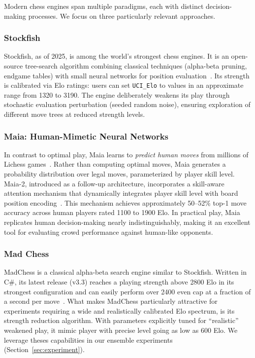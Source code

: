 \documentclass[format=acmsmall, review=false]{acmart}
\begin{document}
Modern chess engines span multiple paradigms, each with distinct decision-making processes.
We focus on three particularly relevant approaches.

\subsubsection{Stockfish}

Stockfish, as of 2025, is among the world's strongest chess engines.
It is an open-source tree-search algorithm combining classical techniques (alpha-beta pruning, endgame tables) with small neural networks for position evaluation~\cite{stockfish2024}.
Its strength is calibrated via Elo ratings: users can set \texttt{UCI\_Elo} to values in an approximate range from 1320 to 3190.
The engine deliberately weakens its play through stochastic evaluation perturbation (seeded random noise), ensuring exploration of different move trees at reduced strength levels.

\subsubsection{Maia: Human-Mimetic Neural Networks}

In contrast to optimal play, Maia learns to \emph{predict human moves} from millions of Lichess games~\cite{mcilroy-young2020}.
Rather than computing optimal moves, Maia generates a probability distribution over legal moves, parameterized by player skill level.
Maia-2, introduced as a follow-up architecture, incorporates a skill-aware attention mechanism that dynamically integrates player skill level with board position encoding~\cite{maia2024}.
This mechanism achieves approximately 50--52\% top-1 move accuracy across human players rated 1100 to 1900 Elo.
In practical play, Maia replicates human decision-making nearly indistinguishably, making it an excellent tool for evaluating crowd performance against human-like opponents.

\subsubsection{Mad Chess}

MadChess is a classical alpha-beta search engine similar to Stockfish.
Written in C\#, its latest release (v3.3) reaches a playing strength above 2800 Elo in its strongest configuration and can easily perform over 2400 even cap at a fraction of a second per move~\cite{madchess2025}.
What makes MadChess particularly attractive for experiments requiring a wide and realistically calibrated Elo spectrum, is its strength reduction algorithm.
With parameters explicitly tuned for “realistic” weakened play, it mimic player with precise level going as low as 600 Elo.
We leverage theses capabilities in our ensemble experiments (Section~\ref{sec:experiment}).
\end{document}
